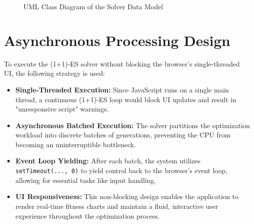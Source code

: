 \begin{figure}[htbp]
{
}%
\caption{UML Class Diagram of the Solver Data Model}
\label{fig:class_diagram}
\end{figure}

\section{Asynchronous Processing Design}

To execute the (1+1)-ES solver without blocking the browser's single-threaded UI, the following strategy is used:

\begin{itemize}
    \item \textbf{Single-Threaded Execution:} Since JavaScript runs on a single main thread, a continuous (1+1)-ES loop would block UI updates and result in "unresponsive script" warnings.
    \item \textbf{Asynchronous Batched Execution:} The solver partitions the optimization workload into discrete batches of generations, preventing the CPU from becoming an uninterruptible bottleneck.
    \item \textbf{Event Loop Yielding:} After each batch, the system utilizes \texttt{setTimeout(..., 0)} to yield control back to the browser's event loop, allowing for essential tasks like input handling.
    \item \textbf{UI Responsiveness:} This non-blocking design enables the application to render real-time fitness charts and maintain a fluid, interactive user experience throughout the optimization process.
\end{itemize}

